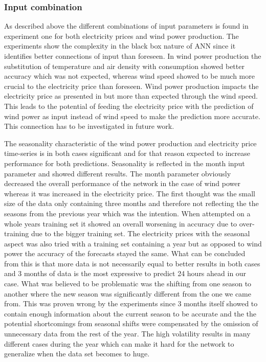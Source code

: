 \subsubsection{Input combination}
As described above the different combinations of input parameters is found in experiment one for both electricity prices and wind power production. The experiments show the complexity in the black box nature of ANN since it identifies better connections of input than foreseen. In wind power production the substitution of temperature and air density with consumption showed better accuracy which was not expected, whereas wind speed showed to be much more crucial to the electricity price than foreseen. Wind power production impacts the electricity price as presented in \cite{dayAheadImpactOfWindPowerForecasts} but more than expected through the wind speed. This leads to the potential of feeding the electricity price with the prediction of wind power as input instead of wind speed to make the prediction more accurate. This connection has to be investigated in future work.

The seasonality characteristic of the wind power production and electricity price time-series is in both cases significant and for that reason expected to increase performance for both predictions. Seasonality is reflected in the month input parameter and showed different results. The month parameter obviously decreased the overall performance of the network in the case of wind power whereas it was increased in the electricity price. The first thought was the small size of the data only containing three months and therefore not reflecting the the seasons from the previous year which was the intention. When attempted on a whole years training set it showed an overall worsening in accuracy due to over-training due to the bigger training set. The electricity prices with the seasonal aspect was also tried with a training set containing a year but as opposed to wind power the accuracy of the forecasts stayed the same. What can be concluded from this is that more data is not necessarily equal to better results in both cases and 3 months of data is the most expressive to predict 24 hours ahead in our case. What was believed to be problematic was the shifting from one season to another where the new season was significantly different from the one we came from. This was proven wrong by the experiments since 3 months itself showed to contain enough information about the current season to be accurate and the the potential shortcomings from seasonal shifts were compensated by the omission of unnecessary data from the rest of the year. The high volatility results in many different cases during the year which can make it hard for the network to generalize when the data set becomes to huge.

